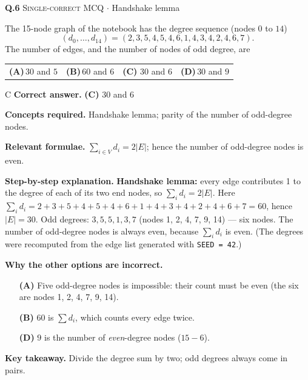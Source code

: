 \documentclass[11pt,a4paper]{article}
\newcommand{\optlabel}[1]{\textbf{(#1)}}
\newcommand{\correctlabel}[1]{\textcolor{okgreen}{\textbf{(#1)}\,\ding{51}}}
\newenvironment{qitem}[1]{\begin{list}{}{\setlength{\leftmargin}{3.3em}\setlength{\labelwidth}{3.1em}%
  \setlength{\labelsep}{0.2em}\setlength{\topsep}{3pt}\setlength{\parsep}{3pt}}\item[\textbf{Q.#1}\hfill]}{\end{list}}
\newcommand{\qsep}{\par\vspace{2pt}{\color{black!15}\hrule}\vspace{4pt}}
\newcommand{\qmeta}[2]{{\footnotesize\color{black!60}\textsc{#1} \;$\cdot$\; #2}\par}
\begin{document}
\begin{qitem}{6}
\qmeta{Single-correct MCQ}{Handshake lemma}
The 15-node graph of the notebook has the degree sequence (nodes $0$ to $14$)
\[ (d_0, \dots, d_{14}) = (2, 3, 5, 4, 5, 4, 6, 1, 4, 3, 4, 2, 4, 6, 7). \]
The number of edges, and the number of nodes of odd degree, are
\par\smallskip\noindent\begin{tabularx}{\linewidth}{@{}*{4}{L}@{}}
\optlabel{A}\,$30$ and $5$ & \optlabel{B}\,$60$ and $6$ & \correctlabel{C}\,$30$ and $6$ & \optlabel{D}\,$30$ and $9$
\end{tabularx}
\end{qitem}
\begin{solbox}{C}
\textbf{\color{brand}Correct answer.} \textcolor{okgreen}{\textbf{(C)}} $30$ and $6$

\textbf{\color{brand}Concepts required.} Handshake lemma; parity of the number of odd-degree nodes.

\textbf{\color{brand}Relevant formulae.} $\sum_{i\in V} d_i = 2|E|$; hence the number of odd-degree nodes is even.

\textbf{\color{brand}Step-by-step explanation.} \textbf{Handshake lemma:} every edge contributes 1 to the degree of each of its two end nodes, so
$\sum_i d_i = 2|E|$. Here $\sum_i d_i = 2+3+5+4+5+4+6+1+4+3+4+2+4+6+7 = 60$, hence $|E| = 30$.
Odd degrees: $3, 5, 5, 1, 3, 7$ (nodes 1, 2, 4, 7, 9, 14) --- six nodes. The number of odd-degree nodes is always even,
because $\sum_i d_i$ is even. (The degrees were recomputed from the edge list generated with \texttt{SEED = 42}.)

\textbf{\color{brand}Why the other options are incorrect.}
\begin{itemize}[leftmargin=2.4em, itemsep=1pt, topsep=2pt]
\item[\textbf{(A)}] Five odd-degree nodes is impossible: their count must be even (the six are nodes 1, 2, 4, 7, 9, 14).
\item[\textbf{(B)}] $60$ is $\sum d_i$, which counts every edge twice.
\item[\textbf{(D)}] $9$ is the number of \emph{even}-degree nodes ($15 - 6$).
\end{itemize}
\textbf{\color{brand}Key takeaway.} Divide the degree sum by two; odd degrees always come in pairs.
\end{solbox}
\qsep
\end{document}
